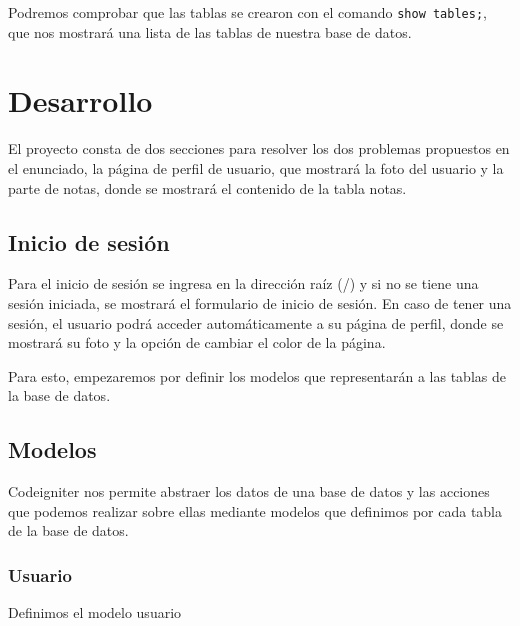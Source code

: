 \documentclass[letter]{article}
\begin{document}
Podremos comprobar que las tablas se crearon con el comando \texttt{show tables;}, que
nos mostrará una lista de las tablas de nuestra base de datos.

\section{Desarrollo}
\label{sec:org1f04d03}
El proyecto consta de dos secciones para resolver los dos problemas propuestos
en el enunciado, la página de perfil de usuario, que mostrará la foto del
usuario y la parte de notas, donde se mostrará el contenido de la tabla notas.

\subsection{Inicio de sesión}
\label{sec:orgc818c63}
Para el inicio de sesión se ingresa en la dirección raíz (/) y si no se tiene
una sesión iniciada, se mostrará el formulario de inicio de sesión. En caso de
tener una sesión, el usuario podrá acceder automáticamente a su página de
perfil, donde se mostrará su foto y la opción de cambiar el color de la página.

Para esto, empezaremos por definir los modelos que representarán a las tablas de
la base de datos.

\subsection{Modelos}
\label{sec:org2252483}
Codeigniter nos permite abstraer los datos de una base de datos y las acciones
que podemos realizar sobre ellas mediante modelos que definimos por cada tabla
de la base de datos.

\subsubsection{Usuario}
\label{sec:orga3a4cb9}
Definimos el modelo usuario
\end{document}
